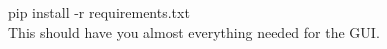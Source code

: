 \documentclass[14pt]{article}
\begin{document}
pip install -r requirements.txt\\

This should have you almost everything needed for the GUI.\\

  





 

                     

\end{document}
